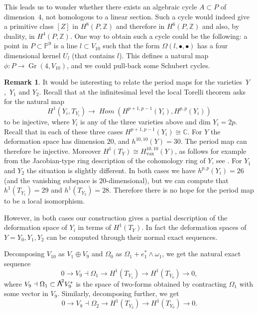 \documentclass[JEP,XML,SOM,Unicode,NoEqCountersInSection]{cedram}
\newcommand{\sbullet}{{\scriptstyle\bullet}}
\newcommand\bw[1]{{\hbox{\large$\mathsf{\Lambda}$}^{\!#1}}}
\newcommand{\van}{\mathrm{van}}
\DeclareMathOperator{\iHom}{\mathit{Hom}}
\theoremstyle{plain}
\theoremstyle{definition}
\newtheorem{remark}[theorem]{Remark}
\DeclareMathOperator{\Gr}{Gr}
\newcommand{\ZZ}{\mathbb{Z}}
\newcommand{\CC}{\mathbb{C}}
\newcommand{\PP}{\mathbb{P}}
\begin{document}
This leads us to wonder whether there exists an algebraic cycle $A \subset P$ of dimension~$4$, not homologous to a linear section. Such a cycle would indeed give a primitive class
$[Z]$ in $H^8(P,\ZZ)$ and therefore in $H^6(P,\ZZ)$ and also, by duality, in $H^4(P,\ZZ)$.
One way to obtain such a cycle could be the following: a point in $P \subset \PP^9$ is a line
$l \subset V_{10}$ such that the form $\Omega(l,\sbullet,\sbullet)$ has a four dimensional
kernel $U_l$ (that contains $l$). This defines a natural map $\phi: P \to \Gr(4,V_{10})$,
and we could pull-back some Schubert cycles.

\begin{remark}
It would be interesting to relate the period maps for the varieties~$Y$,~$Y_1$ and $Y_2$.
Recall that at the infinitesimal level the local Torelli theorem asks for the natural map\vspace*{-3pt}
\[
 H^1(Y_i, T_{Y_i}) \to \iHom(H^{p+1, p-1}(Y_i), H^{p,p}(Y_i))
\]
to be injective, where $Y_i$ is any of the three varieties above and dim $Y_i=2p$. Recall that in each of these three cases $H^{p+1, p-1}(Y_i) \cong \CC$. For $Y$ the deformation space has dimension $20$, and $h^{10,10}(Y)=30$. The period map can therefore be injective. Moreover $H^1(T_Y) \cong H^{10,10}_{\van}(Y)$, as follows for example from the Jacobian-type ring description of the cohomology ring of $Y$, see \cite{eg2}. For $Y_1$ and $Y_2$ the situation is slightly different. In both cases we have $h^{p,p}(Y_i)=26$ (and the vanishing subspace is $20$-dimensional), but we can compute that $h^1(T_{Y_1})=29$ and $h^1(T_{Y_2})=28$. Therefore there is no hope for the period map to be a local isomorphism.

However, in both cases our construction gives a partial description of the deformation space of $Y_i$ in terms of $H^1(T_Y)$.
In fact the deformation spaces of $Y=Y_0, Y_1, Y_2$ can be computed through their normal
exact sequences.

Decomposing $V_{10}$ as $V_1\oplus V_9$ and $\Omega_0$ as $\Omega_1+e_1^*\wedge\omega_1$,
we get the natural exact sequence\vspace*{-3pt}
\[
0\to V_9\dashv\Omega_1\to H^1(T_{Y_1})\to H^1(T_{Y_0})\to 0,
\]
where $V_9\dashv\Omega_1\subset \bw2V_{9}^*$ is the space of two-forms obtained by contracting
$\Omega_1$ with some vector in $V_9$.
Similarly, decomposing further, we get\vspace*{-3pt}
\[
0\to V_8\dashv\Omega_2\to H^1(T_{Y_2})\to H^1(T_{Y_0})\to 0.
\]
\end{remark}
\end{document}
